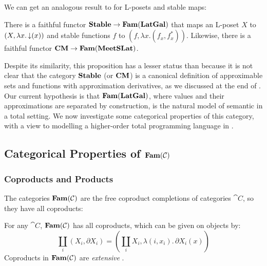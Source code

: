 We can get an analogous result to  for
L-posets and stable maps:

\begin{proposition}
  \label{prop:embed-stable}
  There is a faithful functor $\mathbf{Stable} \to \mathbf{Fam}(\mathbf{LatGal})$ that maps an
  L-poset $X$ to $(X, \lambda x. \mathop{\downarrow}(x))$ and stable functions
  $f$ to $(f, \lambda x. (f_x, f^*_x))$. Likewise, there is a faithful
  functor $\mathbf{CM} \to \mathbf{Fam}(\mathbf{MeetSLat})$.
\end{proposition}

Despite its similarity, this proposition has a lesser status than
 because it is not clear that the category
$\mathbf{Stable}$ (or $\mathbf{CM}$) is a canonical definition of approximable sets
and functions with approximation derivatives, as we discussed at the
end of .
Our current hypothesis is that $\mathbf{Fam}(\mathbf{LatGal})$, where values and their
approximations are separated by construction, is the natural model of
semantic \GPS in a total setting. We now investigate some categorical
properties of this category, with a view to modelling a higher-order
total programming language in .

\subsection{Categorical Properties of $\mathbf{Fam}(\mathcal{C})$}

\subsubsection{Coproducts and Products}
\label{sec:models-of-total-gps:coproducts-and-products}

The categories $\mathbf{Fam}(\mathcal{C})$ are the free coproduct completions of
categories $\cat{C}$, so they have all coproducts:

\begin{proposition}
  For any $\cat{C}$, $\mathbf{Fam}(\mathcal{C})$ has all coproducts, which can be
  given on objects by:
  \begin{displaymath}
    \coprod_i (X_i, \partial X_i) = (\coprod_i X_i, \lambda (i, x_i).\, \partial X_i(x))
  \end{displaymath}
  Coproducts in $\mathbf{Fam}(\mathcal{C})$ are \emph{extensive}
  \cite[Proposition 2.4]{carboni-lack-walters93}.
\end{proposition}

